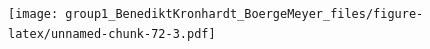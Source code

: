 \documentclass[
  11pt,
  a4paper,
  twoside]{scrbook}
\newenvironment{Shaded}{\begin{snugshade}}{\end{snugshade}}
\newcommand{\FunctionTok}[1]{\textcolor[rgb]{0.00,0.00,0.00}{#1}}
\newcommand{\NormalTok}[1]{#1}
\newcommand{\SpecialCharTok}[1]{\textcolor[rgb]{0.00,0.00,0.00}{#1}}
\begin{document}
\linespread{1}

\begin{Shaded}
\end{Shaded}

\linespread{1}\texttt{[image: group1\_BenediktKronhardt\_BoergeMeyer\_files/figure-latex/unnamed-chunk-72-3.pdf]}



\doublespacing
\end{document}
